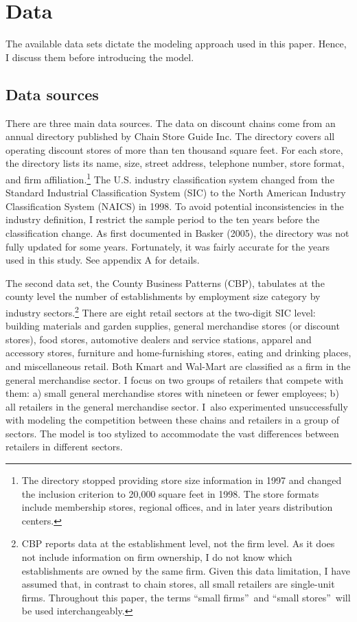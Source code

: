 \documentclass[notitlepage,onecolumn,11pt]{article}
\begin{document}
\section{Data}

The available data sets dictate the modeling approach used in this paper.
Hence, I discuss them before introducing the model.

\subsection{Data sources}

There are three main data sources. The data on discount chains come from an
annual directory published by Chain Store Guide Inc. The directory covers
all operating discount stores of more than ten thousand square feet. For
each store, the directory lists its name, size, street address, telephone
number, store format, and firm affiliation.\footnote{%
The directory stopped providing store size information in 1997 and changed
the inclusion criterion to 20,000 square feet in 1998. The store formats
include membership stores, regional offices, and in later years distribution
centers.} The U.S. industry classification system changed from the Standard
Industrial Classification System (SIC) to the North American Industry
Classification System (NAICS) in 1998. To avoid potential inconsistencies in
the industry definition, I restrict the sample period to the ten years
before the classification change. As first documented in Basker (2005), the
directory was not fully updated for some years. Fortunately, it was fairly
accurate for the years used in this study. See appendix A for details.

The second data set, the County Business Patterns (CBP), tabulates at the
county level the number of establishments by employment size category by
industry sectors.\footnote{%
CBP reports data at the establishment level, not the firm level. As it does
not include information on firm ownership, I do not know which
establishments are owned by the same firm. Given this data limitation, I
have assumed that, in contrast to chain stores, all small retailers are
single-unit firms. Throughout this paper, the terms \textquotedblleft small
firms\textquotedblright\ and \textquotedblleft small
stores\textquotedblright\ will be used interchangeably.} There are eight
retail sectors at the two-digit SIC level: building materials and garden
supplies, general merchandise stores (or discount stores), food stores,
automotive dealers and service stations, apparel and accessory stores,
furniture and home-furnishing stores, eating and drinking places, and
miscellaneous retail. Both Kmart and Wal-Mart are classified as a firm in
the general merchandise sector. I focus on two groups of retailers that
compete with them: a) small general merchandise stores with nineteen or
fewer employees; b) all retailers in the general merchandise sector. I\ also
experimented unsuccessfully with modeling the competition between these
chains and retailers in a group of sectors. The model is too stylized to
accommodate the vast differences between retailers in different sectors.
\end{document}
